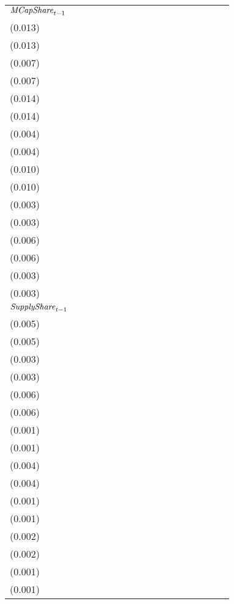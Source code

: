 \begin{tabular}{lllllllllllllllll}
${{\it MCapShare}}_{t-1}$    &   \makecell{$0.134^{**}$ \\(0.013)} &   \makecell{$0.140^{**}$ \\(0.013)} &     \makecell{$0.014^{}$ \\(0.007)} &    \makecell{$0.015^{*}$ \\(0.007)} &   \makecell{$1.723^{**}$ \\(0.014)} &   \makecell{$1.721^{**}$ \\(0.014)} &   \makecell{$0.054^{**}$ \\(0.004)} &   \makecell{$0.054^{**}$ \\(0.004)} &   \makecell{$1.399^{**}$ \\(0.010)} &   \makecell{$1.399^{**}$ \\(0.010)} &   \makecell{$0.052^{**}$ \\(0.003)} &   \makecell{$0.052^{**}$ \\(0.003)} &   \makecell{$0.462^{**}$ \\(0.006)} &  \makecell{$0.464^{**}$ \\(0.006)} &  \makecell{$0.043^{**}$ \\(0.003)} &  \makecell{$0.043^{**}$ \\(0.003)} \\
${{\it SupplyShare}}_{t-1}$  &   \makecell{$0.219^{**}$ \\(0.005)} &   \makecell{$0.217^{**}$ \\(0.005)} &   \makecell{$0.040^{**}$ \\(0.003)} &   \makecell{$0.039^{**}$ \\(0.003)} &   \makecell{$0.113^{**}$ \\(0.006)} &   \makecell{$0.113^{**}$ \\(0.006)} &    \makecell{$0.003^{*}$ \\(0.001)} &    \makecell{$0.003^{*}$ \\(0.001)} &   \makecell{$0.094^{**}$ \\(0.004)} &   \makecell{$0.094^{**}$ \\(0.004)} &     \makecell{$0.002^{}$ \\(0.001)} &     \makecell{$0.002^{}$ \\(0.001)} &   \makecell{$0.116^{**}$ \\(0.002)} &  \makecell{$0.116^{**}$ \\(0.002)} &  \makecell{$0.013^{**}$ \\(0.001)} &  \makecell{$0.013^{**}$ \\(0.001)} \\

\end{tabular}
